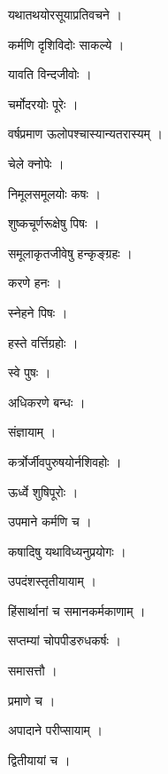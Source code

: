 \documentclass[10pt, openany]{book}
\begin{document}
\noindent यथातथयोरसूयाप्रतिवचने ।

\noindent कर्मणि दृशिविदोः साकल्ये ।

\noindent यावति विन्दजीवोः ।

\noindent चर्मोदरयोः पूरेः ।

\noindent वर्षप्रमाण ऊलोपश्चास्यान्यतरास्यम् ।

\noindent चेले क्नोपेः ।

\noindent निमूलसमूलयोः कषः ।

\noindent शुष्कचूर्णरूक्षेषु पिषः ।

\noindent समूलाकृतजीवेषु हन्कृङ्ग्रहः ।

\noindent करणे हनः ।

\noindent स्नेहने पिषः ।

\noindent हस्ते वर्त्तिग्रहोः ।

\noindent स्वे पुषः ।

\noindent अधिकरणे बन्धः ।

\noindent संज्ञायाम् ।

\noindent कर्त्रोर्जीवपुरुषयोर्नशिवहोः ।

\noindent ऊर्ध्वे शुषिपूरोः ।

\noindent उपमाने कर्मणि च ।

\noindent कषादिषु यथाविध्यनुप्रयोगः ।

\noindent उपदंशस्तृतीयायाम् ।

\noindent हिंसार्थानां च समानकर्मकाणाम् ।

\noindent सप्तम्यां चोपपीडरुधकर्षः ।

\noindent समासत्तौ ।

\noindent प्रमाणे च ।

\noindent अपादाने परीप्सायाम् ।

\noindent द्वितीयायां च ।
\end{document}
